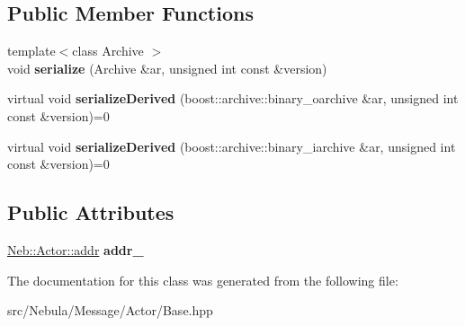 \subsection*{\-Public \-Member \-Functions}
\begin{DoxyCompactItemize}
\item 
\hypertarget{classNeb_1_1Message_1_1Actor_1_1Base_a961a74203562be229bb3bd1a047dc6d2}{{\footnotesize template$<$class Archive $>$ }\\void {\bfseries serialize} (\-Archive \&ar, unsigned int const \&version)}\label{classNeb_1_1Message_1_1Actor_1_1Base_a961a74203562be229bb3bd1a047dc6d2}

\item 
\hypertarget{classNeb_1_1Message_1_1Actor_1_1Base_a81b750ebdc5e296d9ea892fe8e069934}{virtual void {\bfseries serialize\-Derived} (boost\-::archive\-::binary\-\_\-oarchive \&ar, unsigned int const \&version)=0}\label{classNeb_1_1Message_1_1Actor_1_1Base_a81b750ebdc5e296d9ea892fe8e069934}

\item 
\hypertarget{classNeb_1_1Message_1_1Actor_1_1Base_a32fc3888e2723e8babdb9d131bac7692}{virtual void {\bfseries serialize\-Derived} (boost\-::archive\-::binary\-\_\-iarchive \&ar, unsigned int const \&version)=0}\label{classNeb_1_1Message_1_1Actor_1_1Base_a32fc3888e2723e8babdb9d131bac7692}

\end{DoxyCompactItemize}
\subsection*{\-Public \-Attributes}
\begin{DoxyCompactItemize}
\item 
\hypertarget{classNeb_1_1Message_1_1Actor_1_1Base_ae59958d13992055e11bfc40d16a702cf}{\hyperlink{classNeb_1_1Actor_1_1addr}{\-Neb\-::\-Actor\-::addr} {\bfseries addr\-\_\-}}\label{classNeb_1_1Message_1_1Actor_1_1Base_ae59958d13992055e11bfc40d16a702cf}

\end{DoxyCompactItemize}


\-The documentation for this class was generated from the following file\-:\begin{DoxyCompactItemize}
\item 
src/\-Nebula/\-Message/\-Actor/\-Base.\-hpp\end{DoxyCompactItemize}
